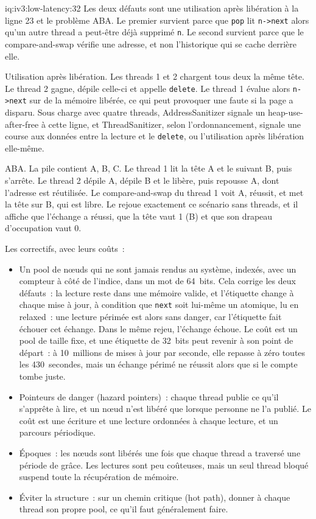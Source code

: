 \begin{solution}{iq:iv3:low-latency:32}
Les deux défauts sont une utilisation après libération à la ligne 23 et le problème ABA. Le premier survient parce que \texttt{pop} lit \texttt{n->next} alors qu'un autre thread a peut-être déjà supprimé \texttt{n}. Le second survient parce que le compare-and-swap vérifie une adresse, et non l'historique qui se cache derrière elle.

Utilisation après libération. Les threads 1 et 2 chargent tous deux la même tête. Le thread 2 gagne, dépile celle-ci et appelle \texttt{delete}. Le thread 1 évalue alors \texttt{n->next} sur de la mémoire libérée, ce qui peut provoquer une faute si la page a disparu. Sous charge avec quatre threads, AddressSanitizer signale un heap-use-after-free à cette ligne, et ThreadSanitizer, selon l'ordonnancement, signale une course aux données entre la lecture et le \texttt{delete}, ou l'utilisation après libération elle-même.

ABA. La pile contient A, B, C. Le thread 1 lit la tête A et le suivant B, puis s'arrête. Le thread 2 dépile A, dépile B et le libère, puis repousse A, dont l'adresse est réutilisée. Le compare-and-swap du thread 1 voit A, réussit, et met la tête sur B, qui est libre. Le  rejoue exactement ce scénario sans threads, et il affiche que l'échange a réussi, que la tête vaut 1 (B) et que son drapeau d'occupation vaut 0.
\label{lst:iv3:ll:aba}

Les correctifs, avec leurs coûts~:
\begin{itemize}
\item Un pool de nœuds qui ne sont jamais rendus au système, indexés, avec un compteur à côté de l'indice, dans un mot de 64~bits. Cela corrige les deux défauts~: la lecture reste dans une mémoire valide, et l'étiquette change à chaque mise à jour, à condition que \texttt{next} soit lui-même un atomique, lu en relaxed~: une lecture périmée est alors sans danger, car l'étiquette fait échouer cet échange. Dans le même rejeu, l'échange échoue. Le coût est un pool de taille fixe, et une étiquette de 32~bits peut revenir à son point de départ~: à 10~millions de mises à jour par seconde, elle repasse à zéro toutes les 430~secondes, mais un échange périmé ne réussit alors que si le compte tombe juste.
\item Pointeurs de danger (hazard pointers)~: chaque thread publie ce qu'il s'apprête à lire, et un nœud n'est libéré que lorsque personne ne l'a publié. Le coût est une écriture et une lecture ordonnées à chaque lecture, et un parcours périodique.
\item Époques~: les nœuds sont libérés une fois que chaque thread a traversé une période de grâce. Les lectures sont peu coûteuses, mais un seul thread bloqué suspend toute la récupération de mémoire.
\item Éviter la structure~: sur un chemin critique (hot path), donner à chaque thread son propre pool, ce qu'il faut généralement faire.
\end{itemize}


\end{solution}
